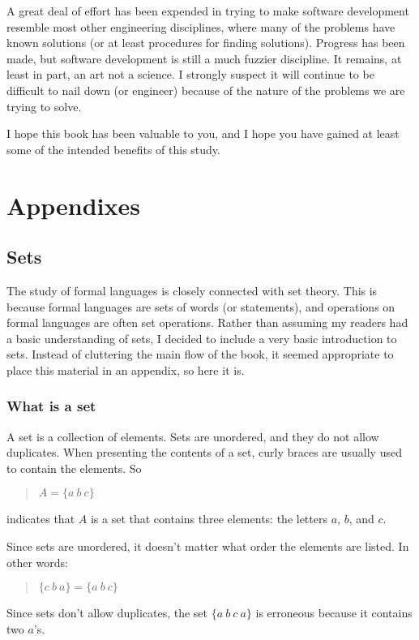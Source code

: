 \documentclass[letterpaper,12pt,openany,reqno]{book}%
\begin{document}
A great deal of effort has been expended in trying to make software development resemble most other engineering disciplines, where many of the problems have known solutions (or at least procedures for finding solutions). Progress has been made, but software development is still a much fuzzier discipline. It remains, at least in part, an art not a science. I strongly suspect it will continue to be difficult to nail down (or engineer) because of the nature of the problems we are trying to solve. 

I hope this book has been valuable to you, and I hope you have gained at least some of the intended benefits of this study.


\appendix

\part{Appendixes}

\chapter{Sets}
\label{C.Sets}
The study of formal languages is closely connected with set theory. This is because formal languages are sets of words (or statements), and operations on formal languages are often set operations. Rather than assuming my readers had a basic understanding of sets, I decided to include a very basic introduction to sets. Instead of cluttering the main flow of the book, it seemed appropriate to place this material in an appendix, so here it is.

\section{What is a set}
A set is a collection of elements. Sets are unordered, and they do not allow duplicates. When presenting the contents of a set, curly braces are usually used to contain the elements. So
\begin{quote}
$A = \{ a \ b \ c\}$
\end{quote}
indicates that $A$ is a set that contains three elements: the letters $a$, $b$, and $c$.

Since sets are unordered, it doesn't matter what order the elements are listed. In other words:
\begin{quote}
$\{ c \ b \ a\} = \{ a \ b \ c\}$
\end{quote}

Since sets don't allow duplicates, the set $\{ a \ b \ c \ a\}$ is erroneous because it contains two $a$'s.
\end{document}
